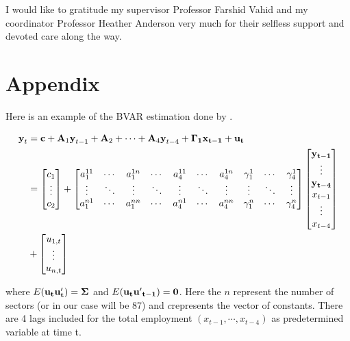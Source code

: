 \documentclass[11pt,a4paper,]{article}
\begin{document}
I would like to gratitude my supervisor Professor Farshid Vahid and my coordinator Professor Heather Anderson very much for their selfless support and devoted care along the way.

\hypertarget{appendix}{%
\section{Appendix}\label{appendix}}

Here is an example of the BVAR estimation done by \textcite{anderson2020}.

\begin{align}
\textbf{y}_t&=\textbf{c}+\textbf{A}_1 \textbf{y}_{t-1}+\textbf{A}_2+\cdots+\textbf{A}_4\textbf{y}_{t-4}+\bf{\Gamma}_1\textbf{x}_{t-1}+\bf{u}_t\\
&=
\begin{bmatrix}
c_1\\
\vdots\\
c_2
\end{bmatrix}
+
\begin{bmatrix}
a_1^{11}&\cdots&a_1^{1n}&\cdots&a_4^{11}&\cdots&a_4^{1n}&\gamma_1^{1}&\cdots&\gamma_4^{1}\\
\vdots&\ddots&\vdots&\ddots&\vdots&\ddots&\vdots&\vdots&\ddots&\vdots\\
a_1^{n1}&\cdots&a_1^{nn}&\cdots&a_4^{n1}&\cdots&a_4^{nn}&\gamma_1^n&\cdots&\gamma_4^n\\
\end{bmatrix}
\begin{bmatrix}
\bf{y}_{t-1}\\
\vdots\\
\bf{y}_{t-4}\\
x_{t-1}\\
\vdots\\
x_{t-4}
\end{bmatrix}\\
&+
\begin{bmatrix}
u_{1,t}\\
\vdots\\
u_{n,t}
\end{bmatrix}\\
\end{align}

where \(E(\bf{u}_t\bf{u}'_t)=\bf{\Sigma}\) and \(E(\bf{u}_t\bf{u'}_{t-1})=0\). Here the \(n\) represent the number of sectors (or in our case will be 87) and \(c\)represents the vector of constants. There are 4 lags included for the total employment \((x_{t-1},\cdots,x_{t-4})\) as predetermined variable at time t.
\end{document}

